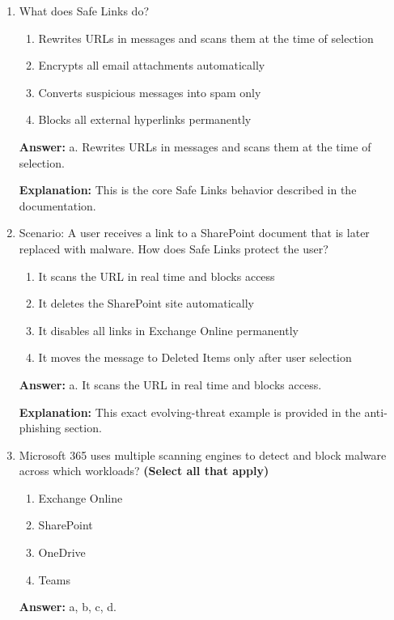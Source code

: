 \documentclass[10pt]{article}
\begin{document}
\begin{enumerate}[leftmargin=*]
\textbf{Explanation:} The documentation uses this exact example to describe character substitution deception.

\item What does Safe Links do?
\begin{enumerate}[label=\alph*., leftmargin=1.5em]
\item Rewrites URLs in messages and scans them at the time of selection
\item Encrypts all email attachments automatically
\item Converts suspicious messages into spam only
\item Blocks all external hyperlinks permanently
\end{enumerate}
\textbf{Answer:} a. Rewrites URLs in messages and scans them at the time of selection.

\textbf{Explanation:} This is the core Safe Links behavior described in the documentation.

\item Scenario: A user receives a link to a SharePoint document that is later replaced with malware. How does Safe Links protect the user?
\begin{enumerate}[label=\alph*., leftmargin=1.5em]
\item It scans the URL in real time and blocks access
\item It deletes the SharePoint site automatically
\item It disables all links in Exchange Online permanently
\item It moves the message to Deleted Items only after user selection
\end{enumerate}
\textbf{Answer:} a. It scans the URL in real time and blocks access.

\textbf{Explanation:} This exact evolving-threat example is provided in the anti-phishing section.

\item Microsoft 365 uses multiple scanning engines to detect and block malware across which workloads? \textbf{(Select all that apply)}
\begin{enumerate}[label=\alph*., leftmargin=1.5em]
\item Exchange Online
\item SharePoint
\item OneDrive
\item Teams
\end{enumerate}
\textbf{Answer:} a, b, c, d.


\end{enumerate}
\end{document}
